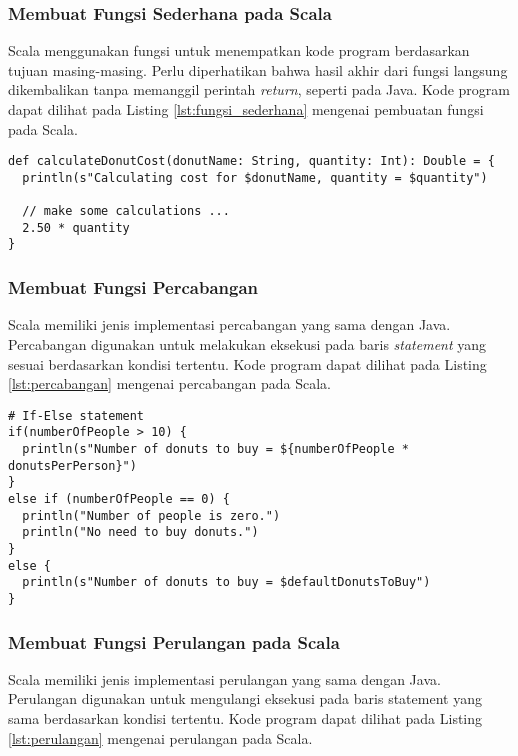 \subsubsection{Membuat Fungsi Sederhana pada Scala}
Scala menggunakan fungsi untuk menempatkan kode program berdasarkan tujuan masing-masing. Perlu diperhatikan bahwa hasil akhir dari fungsi langsung dikembalikan tanpa memanggil perintah \textit{return}, seperti pada Java. Kode program dapat dilihat pada Listing \ref{lst:fungsi_sederhana} mengenai pembuatan fungsi pada Scala.

\begin{lstlisting}[basicstyle=\ttfamily, frame=single,
	columns=fullflexible, keepspaces=true, breaklines=true, label=lst:fungsi_sederhana, caption=Membuat Fungsi Sedehana pada Scala]
def calculateDonutCost(donutName: String, quantity: Int): Double = {
  println(s"Calculating cost for $donutName, quantity = $quantity")

  // make some calculations ...
  2.50 * quantity
}
\end{lstlisting}

\subsubsection{Membuat Fungsi Percabangan}
Scala memiliki jenis implementasi percabangan yang sama dengan Java. Percabangan digunakan untuk melakukan eksekusi pada baris \textit{statement} yang sesuai berdasarkan kondisi tertentu. Kode program dapat dilihat pada Listing \ref{lst:percabangan} mengenai percabangan pada Scala.

\begin{lstlisting}[basicstyle=\ttfamily, frame=single,
	columns=fullflexible, keepspaces=true, breaklines=true, label=lst:percabangan, caption=Membuat Fungsi Percabangan pada Scala]
# If-Else statement
if(numberOfPeople > 10) { 
  println(s"Number of donuts to buy = ${numberOfPeople * donutsPerPerson}")
}
else if (numberOfPeople == 0) {
  println("Number of people is zero.")
  println("No need to buy donuts.")
} 
else {
  println(s"Number of donuts to buy = $defaultDonutsToBuy")
}
\end{lstlisting}

\subsubsection{Membuat Fungsi Perulangan pada Scala}
Scala memiliki jenis implementasi perulangan yang sama dengan Java. Perulangan digunakan untuk mengulangi eksekusi pada baris statement yang sama berdasarkan kondisi tertentu. Kode program dapat dilihat pada Listing \ref{lst:perulangan} mengenai perulangan pada Scala.

